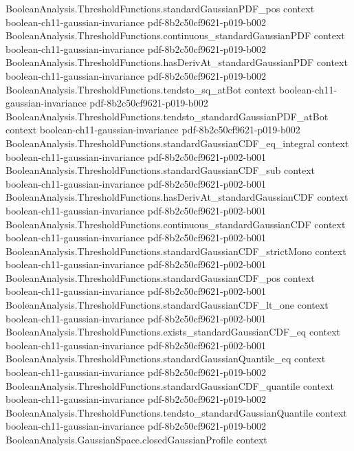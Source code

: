 \begin{theorem}
  {BooleanAnalysis.ThresholdFunctions.standardGaussianPDF_pos}
  {context}
  {boolean-ch11-gaussian-invariance}
  {pdf-8b2c50cf9621-p019-b002}
\proofstep
  {BooleanAnalysis.ThresholdFunctions.continuous_standardGaussianPDF}
  {context}
  {boolean-ch11-gaussian-invariance}
  {pdf-8b2c50cf9621-p019-b002}
\proofstep
  {BooleanAnalysis.ThresholdFunctions.hasDerivAt_standardGaussianPDF}
  {context}
  {boolean-ch11-gaussian-invariance}
  {pdf-8b2c50cf9621-p019-b002}
\proofstep
  {BooleanAnalysis.ThresholdFunctions.tendsto_sq_atBot}
  {context}
  {boolean-ch11-gaussian-invariance}
  {pdf-8b2c50cf9621-p019-b002}
\proofstep
  {BooleanAnalysis.ThresholdFunctions.tendsto_standardGaussianPDF_atBot}
  {context}
  {boolean-ch11-gaussian-invariance}
  {pdf-8b2c50cf9621-p019-b002}
\proofstep
  {BooleanAnalysis.ThresholdFunctions.standardGaussianCDF_eq_integral}
  {context}
  {boolean-ch11-gaussian-invariance}
  {pdf-8b2c50cf9621-p002-b001}
\proofstep
  {BooleanAnalysis.ThresholdFunctions.standardGaussianCDF_sub}
  {context}
  {boolean-ch11-gaussian-invariance}
  {pdf-8b2c50cf9621-p002-b001}
\proofstep
  {BooleanAnalysis.ThresholdFunctions.hasDerivAt_standardGaussianCDF}
  {context}
  {boolean-ch11-gaussian-invariance}
  {pdf-8b2c50cf9621-p002-b001}
\proofstep
  {BooleanAnalysis.ThresholdFunctions.continuous_standardGaussianCDF}
  {context}
  {boolean-ch11-gaussian-invariance}
  {pdf-8b2c50cf9621-p002-b001}
\proofstep
  {BooleanAnalysis.ThresholdFunctions.standardGaussianCDF_strictMono}
  {context}
  {boolean-ch11-gaussian-invariance}
  {pdf-8b2c50cf9621-p002-b001}
\proofstep
  {BooleanAnalysis.ThresholdFunctions.standardGaussianCDF_pos}
  {context}
  {boolean-ch11-gaussian-invariance}
  {pdf-8b2c50cf9621-p002-b001}
\proofstep
  {BooleanAnalysis.ThresholdFunctions.standardGaussianCDF_lt_one}
  {context}
  {boolean-ch11-gaussian-invariance}
  {pdf-8b2c50cf9621-p002-b001}
\proofstep
  {BooleanAnalysis.ThresholdFunctions.exists_standardGaussianCDF_eq}
  {context}
  {boolean-ch11-gaussian-invariance}
  {pdf-8b2c50cf9621-p002-b001}
\proofstep
  {BooleanAnalysis.ThresholdFunctions.standardGaussianQuantile_eq}
  {context}
  {boolean-ch11-gaussian-invariance}
  {pdf-8b2c50cf9621-p019-b002}
\proofstep
  {BooleanAnalysis.ThresholdFunctions.standardGaussianCDF_quantile}
  {context}
  {boolean-ch11-gaussian-invariance}
  {pdf-8b2c50cf9621-p019-b002}
\proofstep
  {BooleanAnalysis.ThresholdFunctions.tendsto_standardGaussianQuantile}
  {context}
  {boolean-ch11-gaussian-invariance}
  {pdf-8b2c50cf9621-p019-b002}
\proofstep
  {BooleanAnalysis.GaussianSpace.closedGaussianProfile}
  {context}

\end{theorem}
